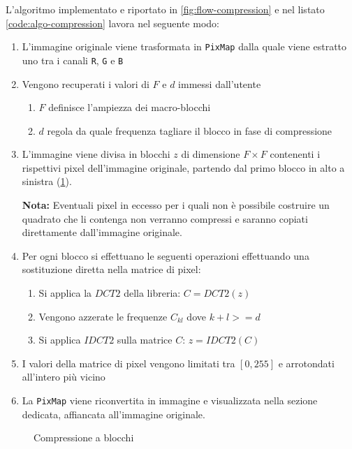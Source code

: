 \documentclass[11pt,italian]{article}
\begin{document}
L'algoritmo implementato e riportato in \cref{fig:flow-compression} e nel listato \ref{code:algo-compression} lavora nel seguente modo:
\begin{enumerate}
    \item L'immagine originale viene trasformata in \lstinline{PixMap} dalla quale viene estratto uno tra i canali \lstinline{R}, \lstinline{G} e \lstinline{B}
	\item Vengono recuperati i valori di $F$ e $d$ immessi dall'utente
	\begin{enumerate}
		\item $F$ definisce l'ampiezza dei macro-blocchi
		\item $d$ regola da quale frequenza tagliare il blocco in fase di compressione
	\end{enumerate}
    \item L'immagine viene divisa in blocchi $z$ di dimensione $F\times F$ contenenti i rispettivi pixel dell'immagine originale, partendo dal primo blocco in alto a sinistra (\cref{fig:flow-compression-block}).

    \textbf{Nota:} Eventuali pixel in eccesso per i quali non è possibile costruire un quadrato che li contenga non verranno compressi e saranno copiati direttamente dall'immagine originale.

	\item Per ogni blocco si effettuano le seguenti operazioni effettuando una sostituzione diretta nella matrice di pixel:
	\begin{enumerate}
		\item Si applica la $\mathit{DCT2}$ della libreria: $C = \mathit{DCT2}(z)$
		\item Vengono azzerate le frequenze $C_{kl}$ dove $k+l >= d$
		\item Si applica $\mathit{IDCT2}$ sulla matrice $C$: $z = \mathit{IDCT2}(C)$
	\end{enumerate}
	\item I valori della matrice di pixel vengono limitati tra $[0,255]$ e arrotondati all'intero più vicino
	\item La \lstinline{PixMap} viene riconvertita in immagine e visualizzata nella sezione dedicata, affiancata all'immagine originale.
\end{enumerate}

\begin{figure}[H]
    \caption{Compressione a blocchi}
    \label{fig:flow-compression-block}
\end{figure}
\end{document}
